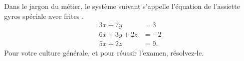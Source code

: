 \begin{exercice}\label{exoMatlab0032}

Dans le jargon du métier, le système suivant s'appelle \og l'équation de l'assiette gyros spéciale avec frites \fg.
\begin{align*}
3x+7y&=3 \\
6x+3y+2z&=-2 \\
5x+2z&=9 .
\end{align*}
Pour votre culture générale, et pour réussir l'examen, résolvez-le.

\end{exercice}
